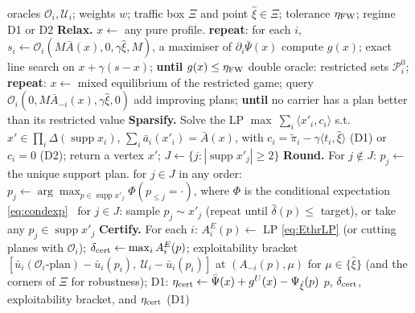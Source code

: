 \documentclass[11pt]{article}
\theoremstyle{definition}
\theoremstyle{remark}
\newcommand{\cP}{\mathcal{P}}
\newcommand{\ub}{\bar u}
\newcommand{\abar}{\bar a}
\newcommand{\Abar}{\bar A}
\newcommand{\supp}{\operatorname{supp}}
\begin{document}
\begin{algorithm}[t]
\caption{RSRC: Relax, Sparsify, Round, Certify}\label{alg:rsrc}
\begin{algorithmic}[1]
\Require oracles $\mathcal O_i,\mathcal U_i$; weights $w$; traffic box $\Xi$ and point $\hat\xi\in\Xi$; tolerance $\eta_{\rm FW}$; regime D1 or D2
\State \textbf{Relax.}
 \State $x\gets$ any pure profile. \textbf{repeat}: for each $i$, $s_i\gets\mathcal O_i(M\Abar(x),0,\gamma\hat\xi,M)$, a maximiser of $\partial_i\bar\Psi(x)$
 \State \hspace{1em} compute $g(x)$; exact line search on $x+\gamma(s-x)$; \textbf{until} $g(x)\le\eta_{\rm FW}$ 
\Else
 \State double oracle: restricted sets $\cP_i^0$; \textbf{repeat}: $x\gets$ mixed equilibrium of the restricted game; query $\mathcal O_i(0,M\Abar_{-i}(x),\gamma\hat\xi,0)$
 \State \hspace{1em} add improving plans; \textbf{until} no carrier has a plan better than its restricted value 
\EndIf
\State \textbf{Sparsify.} Solve the LP $\max\ \sum_i\langle x'_i,c_i\rangle$ s.t.\ $x'\in\prod_i\Delta(\supp x_i)$, $\sum_i\abar_i(x'_i)=\Abar(x)$, with $c_i=\tilde\pi_i-\gamma\langle t_i,\hat\xi\rangle$ (D1) or $c_i=0$ (D2); return a vertex $x'$; $J\gets\{j:|\supp x'_j|\ge2\}$ 
\State \textbf{Round.} For $j\notin J$: $p_j\gets$ the unique support plan.
 for $j\in J$ in any order: $p_j\gets\arg\max_{p\in\supp x'_j}\Phi(p_{\le j}=\cdot)$, where $\Phi$ is the conditional expectation \eqref{eq:condexp}
\Else\ for $j\in J$: sample $p_j\sim x'_j$ (repeat until $\hat\delta(p)\le$ target), or take any $p_j\in\supp x'_j$
\EndIf
\State \textbf{Certify.} For each $i$: $A^E_i(p)\gets$ LP \eqref{eq:EthrLP} (or cutting planes with $\mathcal O_i$); $\delta_{\rm cert}\gets\max_iA^E_i(p)$;
\State \hspace{1em} exploitability bracket $[\ub_i(\mathcal O_i\text{-plan})-\ub_i(p_i),\ \mathcal U_i-\ub_i(p_i)]$ at $(A_{-i}(p),\mu)$ for $\mu\in\{\hat\xi\}$ (and the corners of $\Xi$ for robustness);
\State \hspace{1em} D1: $\eta_{\rm cert}\gets\bar\Psi(x)+g^U(x)-\Psi_{\hat\xi}(p)$
\State \Return $p$, $\delta_{\rm cert}$, exploitability bracket, and $\eta_{\rm cert}$ (D1)
\end{algorithmic}
\end{algorithm}
\end{document}
